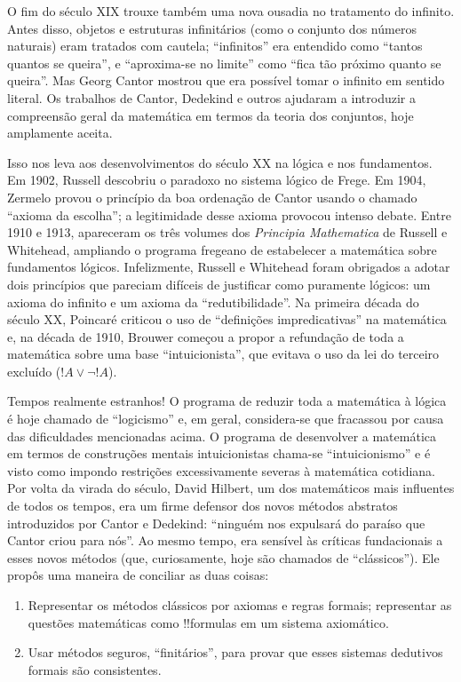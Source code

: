 \documentclass[../../../include/open-logic-section]{subfiles}
\begin{document}
O fim do século XIX trouxe também uma nova ousadia no tratamento do
infinito. Antes disso, objetos e estruturas infinitários (como o
conjunto dos números naturais) eram tratados com cautela; ``infinitos''
era entendido como ``tantos quantos se queira'', e ``aproxima-se no
limite'' como ``fica tão próximo quanto se queira''. Mas Georg Cantor
mostrou que era possível tomar o infinito em sentido literal. Os
trabalhos de Cantor, Dedekind e outros ajudaram a introduzir a
compreensão geral da matemática em termos da teoria dos conjuntos, hoje
amplamente aceita.

Isso nos leva aos desenvolvimentos do século XX na lógica e nos
fundamentos. Em 1902, Russell descobriu o paradoxo no sistema lógico de
Frege. Em 1904, Zermelo provou o princípio da boa ordenação de Cantor
usando o chamado ``axioma da escolha''; a legitimidade desse axioma
provocou intenso debate. Entre 1910 e 1913, apareceram os três volumes
dos \emph{Principia Mathematica} de Russell e Whitehead, ampliando o
programa fregeano de estabelecer a matemática sobre fundamentos
lógicos. Infelizmente, Russell e Whitehead foram obrigados a adotar
dois princípios que pareciam difíceis de justificar como puramente
lógicos: um axioma do infinito e um axioma da ``redutibilidade''. Na
primeira década do século XX, Poincar\'e criticou o uso de ``definições
impredicativas'' na matemática e, na década de 1910, Brouwer começou a
propor a refundação de toda a matemática sobre uma base
``intuicionista'', que evitava o uso da lei do terceiro excluído
($!A \lor \lnot !A$).

Tempos realmente estranhos!{} O programa de reduzir toda a matemática
à lógica é hoje chamado de ``logicismo'' e, em geral, considera-se que
fracassou por causa das dificuldades mencionadas acima. O programa de
desenvolver a matemática em termos de construções mentais
intuicionistas chama-se ``intuicionismo'' e é visto como impondo
restrições excessivamente severas à matemática cotidiana. Por volta da
virada do século, David Hilbert, um dos matemáticos mais influentes de
todos os tempos, era um firme defensor dos novos métodos abstratos
introduzidos por Cantor e Dedekind: ``ninguém nos expulsará do paraíso
que Cantor criou para nós''. Ao mesmo tempo, era sensível às críticas
fundacionais a esses novos métodos (que, curiosamente, hoje são
chamados de ``clássicos''). Ele propôs uma maneira de conciliar as duas
coisas:
\begin{enumerate}
\item Representar os métodos clássicos por axiomas e regras formais;
  representar as questões matemáticas como !!{formula}s em um sistema
  axiomático.
\item Usar métodos seguros, ``finitários'', para provar que esses
  sistemas dedutivos formais são consistentes.
\end{enumerate}
\end{document}
